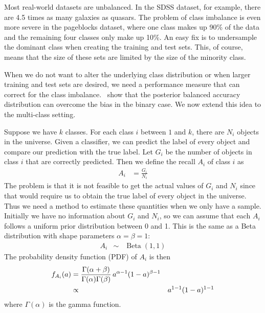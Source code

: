 \documentclass[fleqn,10pt,lineno]{wlpeerj} %
\DeclareMathOperator{\Beta}{Beta}
\begin{document}
Most real-world datasets are unbalanced. In the SDSS dataset, for example,
there are 4.5 times as many galaxies as quasars. The problem of class imbalance
is even more severe in the pageblocks dataset, where one class makes up 90\% of
the data and the remaining four classes only make up 10\%. An easy fix is to
undersample the dominant class when creating the training and test sets. This,
of course, means that the size of these sets are limited by the size of the
minority class.

When we do not want to alter the underlying class distribution or when larger
training and test sets are desired, we need a performance measure that can
correct for the class imbalance.~\cite{brodersen10} show that the posterior
balanced accuracy distribution can overcome the bias in the binary case. We now
extend this idea to the multi-class setting.

Suppose we have $k$ classes. For each class $i$ between $1$ and $k$, there are
$N_i$ objects in the universe. Given a classifier, we can predict the label of
every object and compare our prediction with the true label. Let $G_i$ be the
number of objects in class $i$ that are correctly predicted.
Then we define the recall $A_i$ of class $i$ as
	\begin{align}
		A_i &= \frac{G_i}{N_i}
	\end{align}
The problem is that it is not feasible to get the actual values of $G_i$ and
$N_i$ since that would require us to obtain the true label of every object in
the universe. Thus we need a method to estimate these quantities when we only
have a sample. Initially we have no information about $G_i$ and $N_i$, so we
can assume that each $A_i$ follows a uniform prior distribution between 0 and
1. This is the same as a Beta distribution with shape parameters $\alpha =
\beta = 1$:
	\begin{align}
		A_i &\sim& \Beta(1,1)
	\end{align}
The probability density function (PDF) of $A_i$ is then
    \begin{align}
        f_{A_i}(a) &= \frac{\Gamma(\alpha+\beta)}{\Gamma(\alpha)\Gamma(\beta)}\,
        a^{\alpha-1}(1-a)^{\beta-1} \label{eqn:prior} \\
        &\propto&   a^{1-1}(1-a)^{1-1}  \notag
    \end{align}
where $\Gamma(\alpha)$ is the gamma function.
\end{document}
